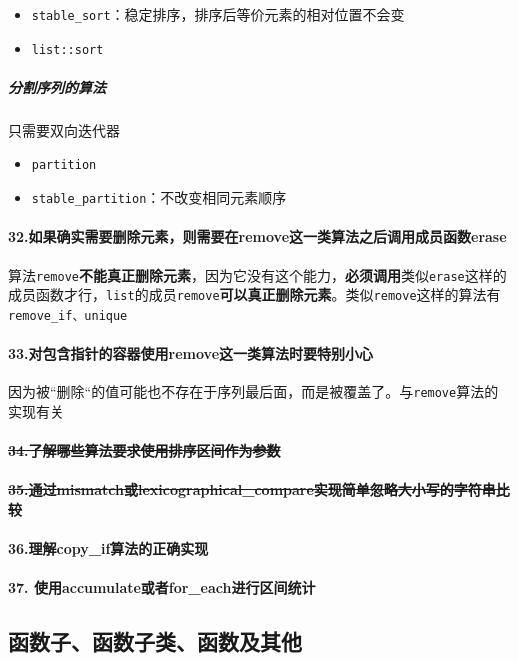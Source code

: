 \documentclass[UTF8,a4paper,12pt]{ctexbook}
\begin{document}
					\begin{itemize}[itemindent = 1em]
						\item \verb|stable_sort|：稳定排序，排序后等价元素的相对位置不会变
						\item \verb|list::sort|
					\end{itemize}
				\subparagraph{分割序列的算法}
					只需要双向迭代器
					\begin{itemize}[itemindent = 1em]
						\item \verb|partition|
						\item \verb|stable_partition|：不改变相同元素顺序
					\end{itemize}
			\paragraph{32.如果确实需要删除元素，则需要在remove这一类算法之后调用成员函数erase}
				算法\verb|remove|\textbf{不能真正删除元素}，因为它没有这个能力，\textbf{必须调用}类似\verb|erase|这样的成员函数才行，\verb|list|的成员\verb|remove|\textbf{可以真正删除元素}。类似\verb|remove|这样的算法有\verb|remove_if、unique|
				
			\paragraph{33.对包含指针的容器使用remove这一类算法时要特别小心} 因为被“删除“的值可能也不存在于序列最后面，而是被覆盖了。与\verb|remove|算法的实现有关
			
			\paragraph{\sout{34.了解哪些算法要求使用排序区间作为参数}}
			\paragraph{\sout{35.通过mismatch或lexicographical\_compare实现简单忽略大小写的字符串比较}}
			
			\paragraph{36.理解copy\_if算法的正确实现}
			\paragraph{37. 使用accumulate或者for\_each进行区间统计}
		\subsection{函数子、函数子类、函数及其他}
\end{document}
